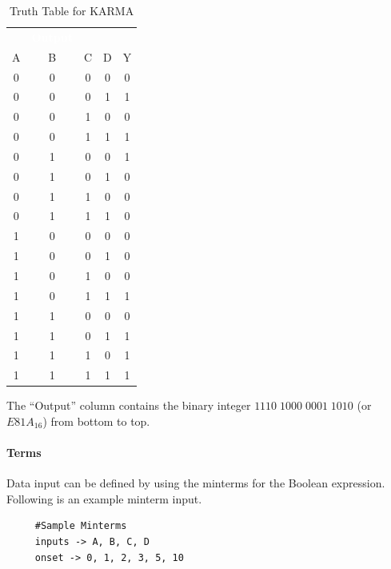 \begin{table}[H]
	\sffamily
	\newcommand{\head}[1]{\textcolor{white}{\textbf{#1}}}		
	\begin{center}
		\begin{tabular}{ccccc} 
			\rowcolor{black!75}
			\multicolumn{4}{c}{\head{Inputs}} & \head{Output} \\
			A & B & C & D & Y \\
			\hline
			0 & 0 & 0 & 0 & 0 \\
			0 & 0 & 0 & 1 & 1 \\
			0 & 0 & 1 & 0 & 0 \\
			0 & 0 & 1 & 1 & 1 \\
			0 & 1 & 0 & 0 & 1 \\
			0 & 1 & 0 & 1 & 0 \\
			0 & 1 & 1 & 0 & 0 \\
			0 & 1 & 1 & 1 & 0 \\
			1 & 0 & 0 & 0 & 0 \\
			1 & 0 & 0 & 1 & 0 \\
			1 & 0 & 1 & 0 & 0 \\
			1 & 0 & 1 & 1 & 1 \\
			1 & 1 & 0 & 0 & 0 \\
			1 & 1 & 0 & 1 & 1 \\
			1 & 1 & 1 & 0 & 1 \\
			1 & 1 & 1 & 1 & 1 \\
		\end{tabular}
	\end{center}
	\caption{Truth Table for KARMA}
  \label{03:tab:truth_table_for_karma}
\end{table}

The ``Output'' column contains the binary integer $ 1110\;1000\;0001\;1010 $ (or $ E81A_{16} $) from bottom to top. 

\paragraph{Terms}
\label{ASM:para:karma_terms}

Data input can be defined by using the minterms for the Boolean expression. Following is an example minterm input.

\begin{verbatim}
     #Sample Minterms
     inputs -> A, B, C, D
     onset -> 0, 1, 2, 3, 5, 10 
\end{verbatim}

